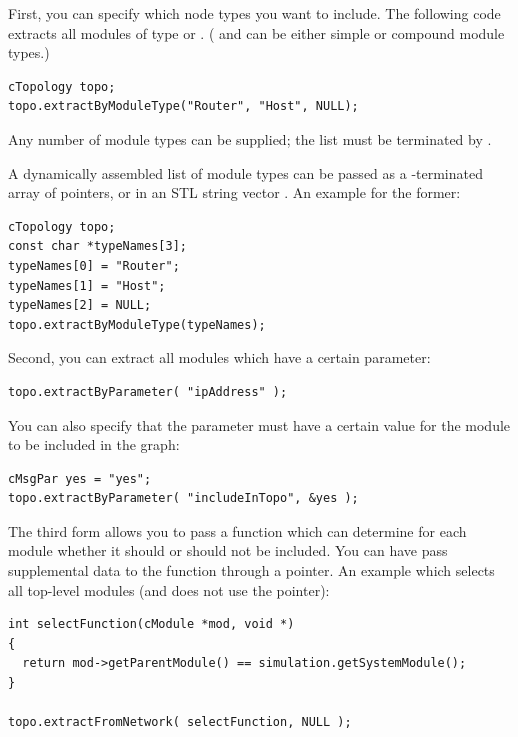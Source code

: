 First, you can specify which node types you want to include. The
following code extracts all modules of type  or .
( and  can be either simple or compound module types.)

\begin{verbatim}
cTopology topo;
topo.extractByModuleType("Router", "Host", NULL);
\end{verbatim}

Any number of module types can be supplied; the list must be terminated by .

A dynamically assembled list of module types can be passed as a
-terminated array of  pointers, or
in an STL string vector .
An example for the former:

\begin{verbatim}
cTopology topo;
const char *typeNames[3];
typeNames[0] = "Router";
typeNames[1] = "Host";
typeNames[2] = NULL;
topo.extractByModuleType(typeNames);
\end{verbatim}

Second, you can extract all modules which have a certain parameter:

\begin{verbatim}
topo.extractByParameter( "ipAddress" );
\end{verbatim}

You can also specify that the parameter must have a certain value
for the module to be included in the graph:

\begin{verbatim}
cMsgPar yes = "yes";
topo.extractByParameter( "includeInTopo", &yes );
\end{verbatim}

The third form allows you to pass a function which can determine for
each module whether it should or should not be included.  You can have
 pass supplemental data to the function through a
 pointer. An example which selects all top-level modules (and
does not use the  pointer):

\begin{verbatim}
int selectFunction(cModule *mod, void *)
{
  return mod->getParentModule() == simulation.getSystemModule();
}

topo.extractFromNetwork( selectFunction, NULL );
\end{verbatim}

%
%

